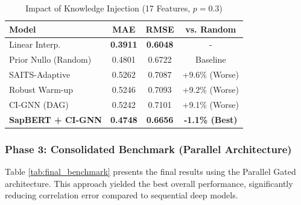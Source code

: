 \begin{table}[h]
\centering
\caption{Impact of Knowledge Injection (17 Features, $p=0.3$)}
\label{tab:graph_results}
\begin{tabular}{@{}lccc@{}}
\toprule
\textbf{Model} & \textbf{MAE} & \textbf{RMSE} & \textbf{vs. Random} \\ \midrule
Linear Interp.      & \textbf{0.3911} & \textbf{0.6048} & - \\ 
Prior Nullo (Random) & 0.4801        & 0.6722        & Baseline \\ \midrule
SAITS-Adaptive      & 0.5262        & 0.7087        & +9.6\% (Worse) \\
Robust Warm-up      & 0.5246        & 0.7093        & +9.2\% (Worse) \\
CI-GNN (DAG)        & 0.5242        & 0.7101        & +9.1\% (Worse) \\
\textbf{SapBERT + CI-GNN} & \textbf{0.4748} & \textbf{0.6656} & \textbf{-1.1\% (Best)} \\ \bottomrule
\end{tabular}
\end{table}

\subsubsection{Phase 3: Consolidated Benchmark (Parallel Architecture)}
Table \ref{tab:final_benchmark} presents the final results using the Parallel Gated architecture. This approach yielded the best overall performance, significantly reducing correlation error compared to sequential deep models.

